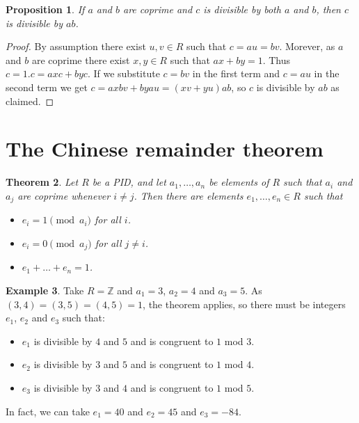 \documentclass{amsart}
\newcommand{\Z}         {{\mathbb{Z}}}
\renewcommand{\:}{\colon}
\newtheorem{theorem}{Theorem}
\newtheorem{proposition}[theorem]{Proposition}
\theoremstyle{definition}
\newtheorem{example}[theorem]{Example}
\begin{document}
\begin{proposition}\label{prop-lcm}
 If $a$ and $b$ are coprime and $c$ is divisible by both $a$ and $b$,
 then $c$ is divisible by $ab$.  
\end{proposition}
\begin{proof}
 By assumption there exist $u,v\in R$ such that $c=au=bv$.  Morever,
 as $a$ and $b$ are coprime there exist $x,y\in R$ such that
 $ax+by=1$.  Thus $c=1.c=axc+byc$.  If we substitute $c=bv$ in the
 first term and $c=au$ in the second term we get
 $c=axbv+byau=(xv+yu)ab$, so $c$ is divisible by $ab$ as claimed.
\end{proof}

\section{The Chinese remainder theorem}

\begin{theorem}\label{thm-chinese}
 Let $R$ be a PID, and let $a_1,\ldots,a_n$ be elements of $R$ such
 that $a_i$ and $a_j$ are coprime whenever $i\neq j$.  Then there are
 elements $e_1,\ldots,e_n\in R$ such that 
 \begin{itemize}
 \item[(a)] $e_i=1\pmod{a_i}$ for all $i$.
 \item[(b)] $e_i=0\pmod{a_j}$ for all $j\neq i$.
 \item[(c)] $e_1+\ldots+e_n=1$.
 \end{itemize}
\end{theorem}
\begin{example}
 Take $R=\Z$ and $a_1=3$, $a_2=4$ and $a_3=5$.  As
 $(3,4)=(3,5)=(4,5)=1$, the theorem applies, so there must be integers
 $e_1$, $e_2$ and $e_3$ such that:
 \begin{itemize}
 \item[(1)] $e_1$ is divisible by $4$ and $5$ and is congruent to $1$
  mod $3$.
 \item[(2)] $e_2$ is divisible by $3$ and $5$ and is congruent to $1$
  mod $4$.
 \item[(3)] $e_3$ is divisible by $3$ and $4$ and is congruent to $1$
  mod $5$.
 \end{itemize}
 In fact, we can take $e_1=40$ and $e_2=45$ and $e_3=-84$.
\end{example}
\end{document}
